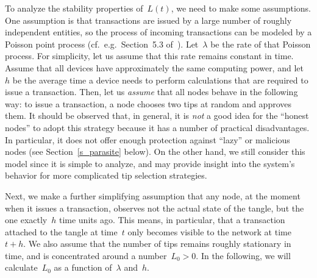 \documentclass[12pt]{article}
\begin{document}
\begin{CJK}{UTF8}{bkai}
To analyze the stability properties of~$L(t)$, we need 
to make some 
assumptions. 
One 
assumption is that
transactions are issued by a large number
of roughly independent entities, so the process of incoming
transactions can be modeled by a Poisson point process
(cf.\ e.g.\ Section~5.3 of~\cite{Ross_m}).
Let~$\lambda$ be the rate of that Poisson process.
 For simplicity, let us assume 
 that 
this rate remains constant in time. 
Assume that all devices have approximately 
the same computing power, and let~$h$ be the average
time a device needs to perform calculations
that are required to issue a transaction.
Then, let us \emph{assume} that all nodes
behave in the following way:
 to issue a transaction, a node 
  chooses
two tips at random and approves them. 
It should be observed that, in general, it is \emph{not}
a good idea for the ``honest nodes'' to adopt
this strategy because it has a number of practical
disadvantages. In particular, it does not offer enough
protection against ``lazy'' or malicious nodes
(see Section~\ref{s_parasite} below). On the other hand,
we still consider this model since it is simple to analyze,
and 
may provide insight into the system's behavior
for more complicated tip selection strategies.

Next, we make a further simplifying assumption that any node,
at the moment when it issues a transaction, observes not the 
actual state of the tangle, but the one exactly~$h$ time units
ago. This means, in particular, that a transaction
attached to the tangle at time~$t$ only becomes 
visible to the network at time~$t+h$. We also assume 
that the number of tips remains roughly stationary
in time, and is concentrated around a number~$L_0>0$.
In the following, we will calculate~$L_0$ as
a function of~$\lambda$ and~$h$. 


\end{CJK}
\end{document}
